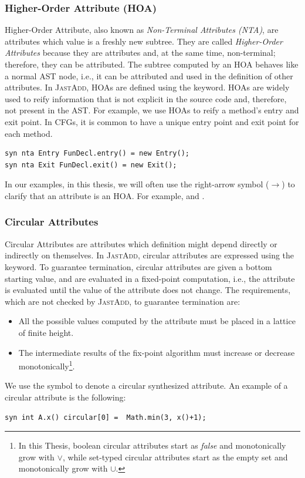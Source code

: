     \subsubsection*{Higher-Order Attribute (HOA)} Higher-Order Attribute, also known as \emph{Non-Terminal Attributes (NTA)}, are attributes which
    value is a freshly new subtree. They are called \emph{Higher-Order Attributes}
    because they are attributes and, at the same time, non-terminal; therefore, they can be attributed.
    The subtree computed by an HOA behaves like a normal AST node, i.e., it can be
    attributed and used in the definition of other attributes. In \textsc{JastAdd}, HOAs
    are defined using the  keyword. HOAs are widely used to reify information
    that is not explicit in the source code and, therefore, not present in the AST.
    For example, we use HOAs to reify a method's entry and exit point. In CFGs, it
    is common to have a unique entry point and exit point for each method.
    \begin{lstlisting}[language=JastAdd]
syn nta Entry FunDecl.entry() = new Entry();
syn nta Exit FunDecl.exit() = new Exit();
    \end{lstlisting}
    In our examples, in this thesis, we will often use the right-arrow symbol (\textcolor{ATGsym}{$\rightarrow$}) to
    clarify that an attribute is an HOA. For example,  and .
    \subsubsection*{Circular Attributes} Circular Attributes are attributes which definition might depend directly
    or indirectly on themselves. In \textsc{JastAdd}, circular attributes are expressed using the 
    keyword. To guarantee termination, circular attributes are given a bottom starting value, and are evaluated in a fixed-point
    computation, i.e., the attribute is evaluated until the value of the attribute does not change.
    The requirements, which are not checked by \textsc{JastAdd}, to guarantee termination are:
    \begin{itemize}
        \item All the possible values computed by the attribute must be placed
        in a lattice of finite height.
        \item The intermediate results of the fix-point algorithm must increase
        or decrease monotonically\footnote{In this Thesis, boolean circular attributes start
        as \emph{false} and monotonically grow with $\vee$, while set-typed circular attributes
        start as the empty set and monotonically grow with $\cup$.}.
    \end{itemize}
    We use the symbol  to denote a circular synthesized attribute.
    An example of a circular attribute is the following:
    \begin{lstlisting}[language=JastAdd]
syn int A.x() circular[0] =  Math.min(3, x()+1);
    \end{lstlisting}

